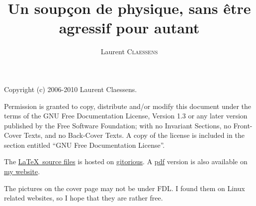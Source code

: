 
\thispagestyle{empty}
\title{Un soupçon de physique, sans être agressif pour autant}
\author{Laurent \textsc{Claessens}}
\maketitle

Copyright (c) 2006-2010  Laurent Claessens.

Permission is granted to copy, distribute and/or modify this document under the terms of the GNU Free Documentation License, Version 1.3 or any later version published by the Free Software Foundation; with no Invariant Sections, no Front-Cover Texts, and no Back-Cover Texts. A copy of the license is included in the section entitled ``GNU Free Documentation License''.

The \href{http://gitorious.org/echa}{\LaTeX\ source files} is hosted on \href{http://fr.wikipedia.org/wiki/Git}{gitorious}. A \href{http://student.ulb.ac.be/~lclaesse/echa.pdf}{pdf} version is also available on \href{http://student.ulb.ac.be/~lclaesse/}{my website}.

\vspace{0.5cm}
The pictures on the cover page may not be under FDL. I found them on Linux related websites, so I hope that they are rather free.

